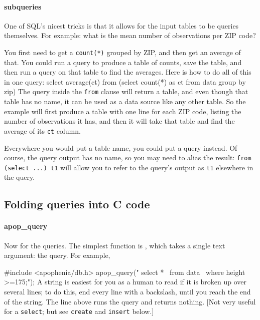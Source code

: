 \paragraph{subqueries}

One of SQL's nicest tricks is that it allows for the input tables to be
queries themselves. For example: what is the mean number of observations per
ZIP code?

You first need to get a {\tt count(*)} grouped by ZIP, and then get an
average of that. You could run a query to produce a table of counts,
save the table, and then run a query on that table to find the averages.
Here is how to do all of this in one query: 
select average(ct) 
   from (select count(*) as ct
            from data
            group by zip)
The query inside the {\tt from} clause will return a table, and even
though that table has no name, it can be used as a data source like any other
table. So the example will first produce a table with one line for each
ZIP code, listing the number of observations it has, and then it will
take that table and find the average of its {\tt ct} column.

Everywhere you would put a table name, you could put a query 
instead. Of course, the query output has no name, so you may need to
alias the result: {\tt from (select ...) t1} will allow you to refer to
the query's output as {\tt t1} elsewhere in the query.

\subsection{Folding queries into C code} 


\paragraph{apop\_query} Now for the queries. The simplest function
is , which takes a single text argument: the
query. For example,

#include <apophenia/db.h>
apop_query(" select *        \
               from data     \
                  where height >=175;");
A string is easiest for you as a human to read if it is
broken up over several lines; to do this, end every line with a
backslash, until you reach the end of the string. The line above runs
the query and returns nothing. [Not very useful for a {\tt select}; but see
{\tt create} and  {\tt insert} below.]

